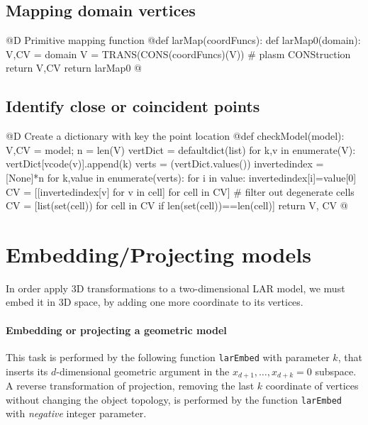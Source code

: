\documentclass[11pt,oneside]{article}	%
\begin{document}
\subsection{Mapping domain vertices}
@D Primitive mapping function 
@{def larMap(coordFuncs):
	def larMap0(domain):
		V,CV = domain
		V = TRANS(CONS(coordFuncs)(V))  # plasm CONStruction
		return V,CV
	return larMap0
@}

\subsection{Identify close or coincident points}

@D Create a dictionary with key the point location
@{def checkModel(model):
	V,CV = model; n = len(V)
	vertDict = defaultdict(list)
	for k,v in enumerate(V): vertDict[vcode(v)].append(k) 
	verts = (vertDict.values())
	invertedindex = [None]*n
	for k,value in enumerate(verts):
		for i in value:
			invertedindex[i]=value[0]	
	CV = [[invertedindex[v] for v in cell] for cell in CV]
	# filter out degenerate cells
	CV = [list(set(cell)) for cell in CV if len(set(cell))==len(cell)]
	return V, CV
@}


\section{Embedding/Projecting models}

In order apply 3D transformations to a two-dimensional LAR model, we must embed it in 3D space, by adding one more coordinate to its vertices. 

\paragraph{Embedding or projecting a geometric model}

This task is performed by the following function \texttt{larEmbed} with parameter $k$, that inserts its $d$-dimensional geometric argument in the $x_{d+1}, \ldots, x_{d+k}=0$ subspace.
A reverse transformation of projection, removing the last $k$ coordinate of vertices without changing the object topology, is performed by the function \texttt{larEmbed} with \emph{negative} integer parameter.
\end{document}
